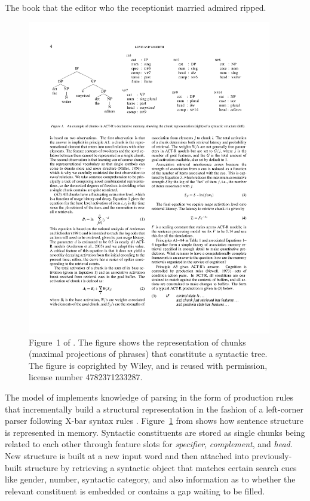 \documentclass{cambridge7A}\usepackage[]{graphicx}\usepackage[]{color}
\begin{document}
\begin{exe}
\ex \label{ex:centeremb}
The book that the editor who the receptionist married admired ripped.
\end{exe}  
%

\begin{figure}[htb]
	\centering
	\includegraphics[width=0.95\textwidth]{figures/lv05-fig1-structure}
	\caption{Figure~1 of \cite{LewisVasishth2005}. The figure shows the representation of chunks (maximal projections of phrases) that constitute a syntactic tree. The figure is coprighted by Wiley, and is reused with permission, license number 4782371233287.}
	\label{fig:lv05chunks}
\end{figure}

The model of \cite{LewisVasishth2005} implements knowledge of parsing in the form of production rules that incrementally build a structural representation in the fashion of a left-corner parser following X-bar syntax rules \citep{Chomsky1986}. 
Figure~\ref{fig:lv05chunks} from \cite{LewisVasishth2005} shows how sentence structure is represented in memory. Syntactic constituents are stored as single chunks being related to each other through feature slots for \emph{specifier}, \emph{complement}, and \emph{head}.
New structure is built at a new input word and then attached into previously-built structure by retrieving a syntactic object that matches certain search cues like gender, number, syntactic category, and also information as to whether the relevant constituent is embedded or contains a gap waiting to be filled. 
\end{document}
